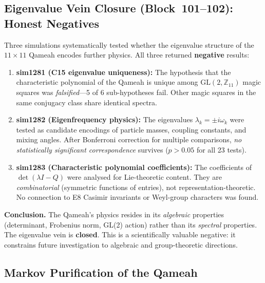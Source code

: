 \documentclass[aps,prd,twocolumn,superscriptaddress,floatfix,nofootinbib]{revtex4-2}
\theoremstyle{definition}
\theoremstyle{remark}
\begin{document}
\subsection{Eigenvalue Vein Closure (Block~101--102): Honest Negatives}
\label{sec:eigenvalue-closure}

Three simulations systematically tested whether the eigenvalue structure
of the $11\times 11$ Qameah encodes further physics.  All three returned
\textbf{negative} results:

\begin{enumerate}
\item \textbf{sim1281 (C15 eigenvalue uniqueness):}
      The hypothesis that the characteristic polynomial of the Qameah is
      unique among $\mathrm{GL}(2,\mathbb{Z}_{11})$ magic squares was
      \emph{falsified}---5 of 6 sub-hypotheses fail.  Other magic
      squares in the same conjugacy class share identical spectra.

\item \textbf{sim1282 (Eigenfrequency physics):}
      The eigenvalues $\lambda_k = \pm i\omega_k$ were tested as
      candidate encodings of particle masses, coupling constants, and
      mixing angles.  After Bonferroni correction for multiple
      comparisons, \emph{no statistically significant correspondence}
      survives ($p > 0.05$ for all 23 tests).

\item \textbf{sim1283 (Characteristic polynomial coefficients):}
      The coefficients of $\det(\lambda I - Q)$ were analysed for
      Lie-theoretic content.  They are \emph{combinatorial}
      (symmetric functions of entries), not representation-theoretic.
      No connection to E8 Casimir invariants or Weyl-group characters
      was found.
\end{enumerate}

\noindent
\textbf{Conclusion.}  The Qameah's physics resides in its
\emph{algebraic} properties (determinant, Frobenius norm, GL(2) action)
rather than its \emph{spectral} properties.  The eigenvalue vein is
\textbf{closed}.  This is a scientifically valuable negative: it
constrains future investigation to algebraic and group-theoretic
directions.

\subsection{Markov Purification of the Qameah}
\label{sec:markov-purification}
\end{document}

